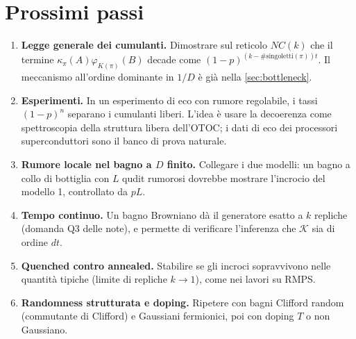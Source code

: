 \section{Prossimi passi}\label{sec:next}
\begin{enumerate}[label=\textbf{N\arabic*.},leftmargin=2.2em]
\item \textbf{Legge generale dei cumulanti.} Dimostrare sul reticolo $NC(k)$ che il termine $\kappa_\pi(A)\varphi_{K(\pi)}(B)$ decade come $(1-p)^{(k-\#\text{singoletti}(\pi))t}$. Il meccanismo all'ordine dominante in $1/D$ è già nella \cref{sec:bottleneck}.
\item \textbf{Esperimenti.} In un esperimento di eco con rumore regolabile, i tassi $(1-p)^{n}$ separano i cumulanti liberi. L'idea è usare la decoerenza come spettroscopia della struttura libera dell'OTOC; i dati di eco dei processori superconduttori sono il banco di prova naturale.
\item \textbf{Rumore locale nel bagno a $D$ finito.} Collegare i due modelli: un bagno a collo di bottiglia con $L$ qudit rumorosi dovrebbe mostrare l'incrocio del modello 1, controllato da $pL$.
\item \textbf{Tempo continuo.} Un bagno Browniano dà il generatore esatto a $k$ repliche (domanda Q3 delle note), e permette di verificare l'inferenza che $\mathcal K$ sia di ordine $dt$.
\item \textbf{Quenched contro annealed.} Stabilire se gli incroci sopravvivono nelle quantità tipiche (limite di repliche $k\to1$), come nei lavori su RMPS.
\item \textbf{Randomness strutturata e doping.} Ripetere con bagni Clifford random (commutante di Clifford) e Gaussiani fermionici, poi con doping $T$ o non Gaussiano.
\end{enumerate}
